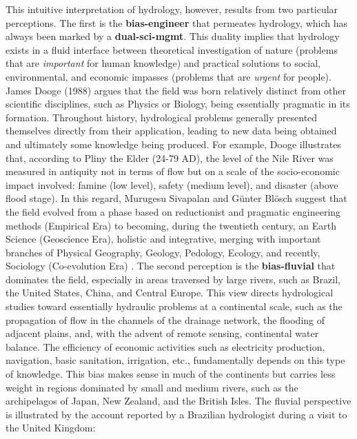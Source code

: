 \documentclass[./main_en.tex]{subfiles}
\begin{document}
\par This intuitive interpretation of \gls{hydrology}, however, results from two particular perceptions. The first is the \textbf{\gls{bias-engineer}} that permeates \gls{hydrology}, which has always been marked by a \textbf{\gls{dual-sci-mgmt}}. This duality implies that \gls{hydrology} exists in a fluid interface between theoretical investigation of nature (problems that are \textit{important} for human knowledge) and practical solutions to social, environmental, and economic impasses (problems that are \textit{urgent} for people). James Dooge (1988) \cite{Dooge1988} argues that the field was born relatively distinct from other scientific disciplines, such as Physics or Biology, being essentially pragmatic in its formation. Throughout history, hydrological problems generally presented themselves directly from their application, leading to new data being obtained and ultimately some knowledge being produced. For example, Dooge illustrates that, according to Pliny the Elder (24-79 AD), the level of the Nile River was measured in antiquity not in terms of flow but on a scale of the socio-economic impact involved: famine (low level), safety (medium level), and disaster (above flood stage). In this regard, Murugesu Sivapalan and Günter Blösch suggest that the field evolved from a phase based on reductionist and pragmatic engineering methods (Empirical Era) to becoming, during the twentieth century, an Earth Science (Geoscience Era), holistic and integrative, merging with important branches of Physical Geography, Geology, Pedology, Ecology, and recently, Sociology (Co-evolution Era) \cite{Sivapalan2017, Sivapalan2018}. The second perception is the \textbf{\gls{bias-fluvial}} that dominates the field, especially in areas traversed by large rivers, such as Brazil, the United States, China, and Central Europe. This view directs hydrological studies toward essentially hydraulic problems at a continental scale, such as the propagation of flow in the channels of the drainage network, the flooding of adjacent plains, and, with the advent of remote sensing, continental water balance. The efficiency of economic activities such as electricity production, navigation, basic sanitation, irrigation, etc., fundamentally depends on this type of knowledge. This bias makes sense in much of the continents but carries less weight in regions dominated by small and medium rivers, such as the archipelagos of Japan, New Zealand, and the British Isles. The fluvial perspective is illustrated by the account reported by a Brazilian hydrologist during a visit to the United Kingdom:
\end{document}
